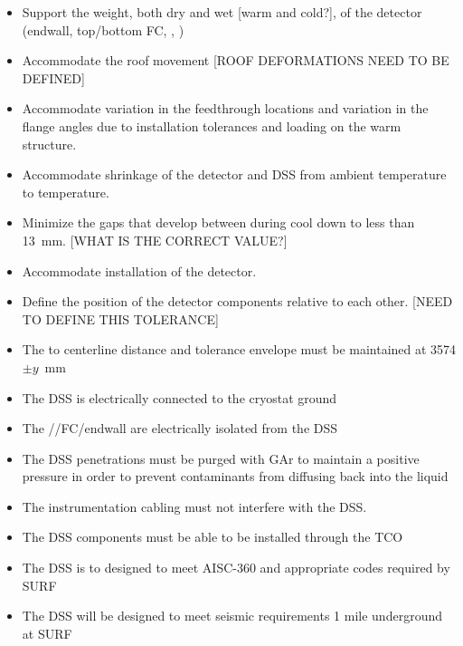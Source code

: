 \begin{itemize}
 \setlength\itemsep{1mm}
\setlength{\parsep}{1mm}
\setlength{\itemsep}{-4mm}
\item Support the weight, both dry and wet [warm and cold?], of
  the detector (endwall, top/bottom FC, , )
\item Accommodate the roof movement [ROOF DEFORMATIONS NEED TO BE DEFINED]
\item Accommodate variation in the feedthrough locations and
  variation in the flange angles due to installation tolerances and
  loading on the warm structure.
\item Accommodate shrinkage of the detector and DSS from ambient
  temperature to  temperature.
\item Minimize the gaps that develop between  during cool down to
  less than \SI{13}{mm}. [WHAT IS THE CORRECT VALUE?]  %
\item Accommodate installation of the detector. 
\item Define the position of the detector components relative to each other. [NEED TO DEFINE THIS TOLERANCE]
\item The  to  centerline distance and tolerance envelope must be maintained at 3574$\pm y$~mm
\item The DSS is electrically connected to the cryostat ground
\item The //FC/endwall are electrically isolated from the DSS
\item The DSS penetrations must be purged with GAr to maintain a positive pressure in order to prevent contaminants from diffusing back into the liquid
\item The instrumentation cabling must not interfere with the DSS.
\item The DSS components must be able to be installed through the TCO
\item The DSS is to designed to meet AISC-360 and appropriate codes required by SURF
\item The DSS will be designed to meet seismic requirements 1 mile underground at SURF

\end{itemize}
